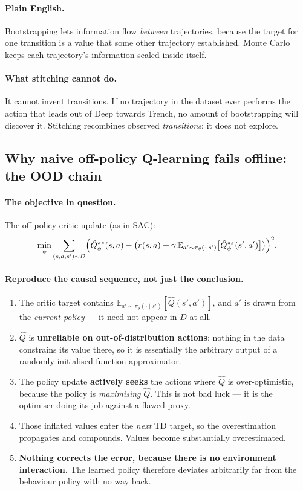 \documentclass[11pt,a4paper]{article}
\begin{document}
\paragraph{Plain English.} Bootstrapping lets information flow \emph{between}
trajectories, because the target for one transition is a value that some other
trajectory established. Monte Carlo keeps each trajectory's information
sealed inside itself.

\paragraph{What stitching cannot do.} It cannot invent transitions. If no
trajectory in the dataset ever performs the action that leads out of Deep
towards Trench, no amount of bootstrapping will discover it. Stitching
recombines observed \emph{transitions}; it does not explore.

\subsection{Why naive off-policy Q-learning fails offline: the OOD chain}

\paragraph{The objective in question.} The off-policy critic update (as in SAC):
\[
\min_\phi \sum_{(s,a,s')\sim D}\Bigl(\hat Q^{\pi_\theta}_\phi(s,a)
-\bigl(r(s,a)+\gamma\,\mathbb E_{a'\sim\pi_\theta(\cdot\mid s')}\bigl[\hat Q^{\pi_\theta}_\phi(s',a')\bigr]\bigr)\Bigr)^2 .
\]

\paragraph{Reproduce the causal sequence, not just the conclusion.}
\begin{enumerate}[label=\arabic*.]
\item The critic target contains
$\mathbb E_{a'\sim\pi_\theta(\cdot\mid s')}[\hat Q(s',a')]$, and $a'$ is drawn
from the \emph{current policy} --- it need not appear in $D$ at all.
\item $\hat Q$ is \textbf{unreliable on out-of-distribution actions}: nothing
in the data constrains its value there, so it is essentially the arbitrary
output of a randomly initialised function approximator.
\item The policy update \textbf{actively seeks} the actions where $\hat Q$ is
over-optimistic, because the policy is \emph{maximising} $\hat Q$. This is
not bad luck --- it is the optimiser doing its job against a flawed proxy.
\item Those inflated values enter the \emph{next} TD target, so the
overestimation propagates and compounds. Values become substantially
overestimated.
\item \textbf{Nothing corrects the error, because there is no environment
interaction.} The learned policy therefore deviates arbitrarily far from the
behaviour policy with no way back.
\end{enumerate}
\end{document}
